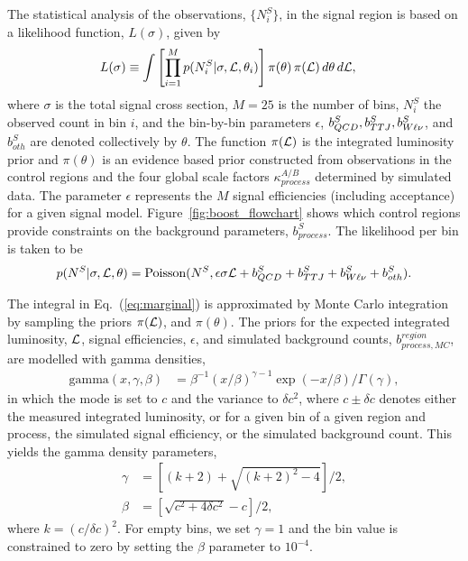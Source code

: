 

The statistical analysis of the observations,  $\{ N^S_i \}$, in the signal region is based on a
likelihood function, $L(\sigma)$, given by
\begin{align}
  L(\sigma) & \equiv  \int   \left[ \prod_{i=1}^M p(N^S_i | \sigma, {\cal L}, \theta_i)  \right] 
\pi(\theta) \, \pi({\cal L}) \, d\theta \, d{\cal L},
\label{eq:marginal}
\end{align}
where $\sigma$ is the total signal cross section, $M = 25$ is the number of bins, $N^S_i$ the
observed count in bin $i$, and the bin-by-bin parameters  $\epsilon$,  $b^S_{QCD}, b^S_{TTJ},
b^S_{W\ell\nu}$, and $b^S_{oth}$ are  denoted collectively by $\theta$. 
The function $\pi({\cal L})$ is the integrated luminosity prior and $\pi(\theta)$ is an evidence
based prior constructed from observations in the control regions and the four global scale factors
$\kappa^{A/B}_{process}$ determined by simulated data. 
The parameter $\epsilon$ represents the $M$ signal efficiencies (including acceptance) for a given
signal model. Figure~\ref{fig:boost_flowchart} shows which control regions provide constraints on
the background parameters, $b^S_{process}$.
The likelihood per bin is taken to be
\begin{equation}
 p(N^S | \sigma, {\cal L}, \theta) = \textrm{Poisson}(N^S,  \epsilon \sigma {\cal L} + b^S_{QCD} +
b^S_{TTJ} + b^S_{W\ell\nu} +  b^{S}_{oth}) .
\end{equation}

The integral in Eq.~(\ref{eq:marginal}) is approximated by Monte Carlo integration by sampling
 the priors $\pi({\cal L})$, and  $\pi(\theta)$. 
The priors for the expected integrated luminosity, ${\cal L}$, signal efficiencies, $\epsilon$, and 
simulated background counts, $b^{region}_{process, MC}$, are modelled with gamma densities,
\begin{align}
\textrm{gamma}(x, \gamma, \beta) &= \beta^{-1}(x/\beta)^{\gamma-1} \exp(-x / \beta) /
\Gamma(\gamma),
\label{eq:gamma}
\end{align}
in which the mode is set to $c$ and the variance to $\delta c^2$, 
where $c \pm \delta c$ denotes either the measured integrated luminosity, or for a given bin of
a given region and process, the simulated signal efficiency, or the simulated background count. This
yields the gamma density parameters,
\begin{align}
   \gamma &= [(k + 2) + \sqrt{(k+2)^2 - 4}]/2,\\
   \beta &= [\sqrt{c^2 + 4\delta c^2} - c]/2,
\end{align}
where $k = (c / \delta c)^2$.
For empty bins, we set $\gamma = 1$ and the bin value is constrained to zero by setting the $\beta$
parameter to $10^{-4}$.
 
